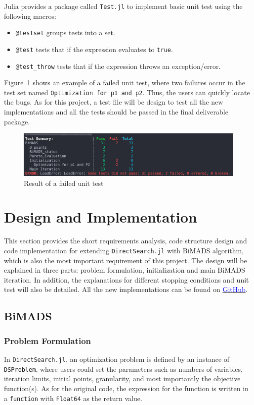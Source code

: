 \documentclass[11pt,oneside,onecolumn,openright]{article}
\begin{document}
  Julia provides a package called \verb|Test.jl| to implement basic unit test using the following macros:
  \begin{itemize}
  \item \verb|@testset| groups tests into a set.
  \item \verb|@test| tests that if the expression evaluates to \verb|true|.
  \item \verb|@test_throw| tests that if the expression throws an exception/error.
  \end{itemize}

  Figure~\ref{fig:test_fail} shows an example of a failed unit test, where two failures occur in the test set named \verb|Optimization for p1 and p2|. Thus, the users can quickly locate the bugs. As for this project, a test file will be design to test all the new implementations and all the tests should be passed in the final deliverable package.
    \begin{figure}[htp]
  \centering
  \includegraphics[width=14cm]{fig/test_fail.png}
  \caption{Result of a failed unit test}
  \label{fig:test_fail}
  \end{figure}

\section{Design and Implementation}\label{sec:ana}
  This section provides the short requirements analysis, code structure design and code implementation for extending \verb|DirectSearch.jl| with BiMADS algorithm, which is also the most important requirement of this project. The design will be explained in three parts: problem formulation, initialization and main BiMADS iteration. In addition, the explanations for different stopping conditions and unit test will also be detailed. All the new implementations can be found on \href{https://github.com/amazing0844/DirectSearch.jl}{\textcolor{blue}{GitHub}}.
  \subsection{BiMADS}
  \subsubsection{Problem Formulation}
  In \verb|DirectSearch.jl|, an optimization problem is defined by an instance of \verb|DSProblem|, where users could set the parameters such as numbers of variables, iteration limits, initial points, granularity, and most importantly the objective function(s). As for the original code, the expression for the function is written in a \verb|function| with \verb|Float64| as the return value.
\end{document}
